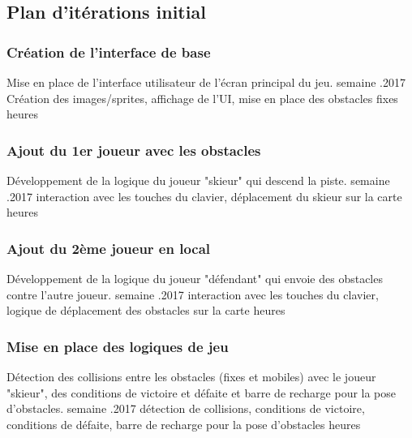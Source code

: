 \documentclass[a4paper,11pt]{article}
\begin{document}
	\subsection{Plan d'itérations initial}
	
	\subsubsection{Création de l'interface de base}
	\begin{enumerate}[labelwidth=5em,leftmargin=8em]
		\objectif Mise en place de l'interface utilisateur de l'écran principal du jeu.
		 semaine
		.2017
		\partageTache Création des images/sprites, affichage de l'UI, mise en place des obstacles fixes
		 heures
	\end{enumerate}

	\subsubsection{Ajout du 1er joueur avec les obstacles}
	\begin{enumerate}[labelwidth=5em,leftmargin=8em]
		\objectif Développement de la logique du joueur "skieur" qui descend la piste.
		 semaine
		.2017
		\partageTache interaction avec les touches du clavier, déplacement du skieur sur la carte
		 heures
	\end{enumerate}

	\subsubsection{Ajout du 2ème joueur en local}
	\begin{enumerate}[labelwidth=5em,leftmargin=8em]
		\objectif Développement de la logique du joueur "défendant" qui envoie des obstacles contre l'autre joueur.
		 semaine
		.2017
		\partageTache interaction avec les touches du clavier, logique de déplacement des obstacles sur la carte
		 heures
	\end{enumerate}

	\subsubsection{Mise en place des logiques de jeu}
	\begin{enumerate}[labelwidth=5em,leftmargin=8em]
		\objectif Détection des collisions entre les obstacles (fixes et mobiles) avec le joueur "skieur", des conditions de victoire et défaite et barre de recharge pour la pose d'obstacles.
		 semaine
		.2017
		\partageTache détection de collisions, conditions de victoire, conditions de défaite, barre de recharge pour la pose d'obstacles
		 heures
	\end{enumerate}
\end{document}
